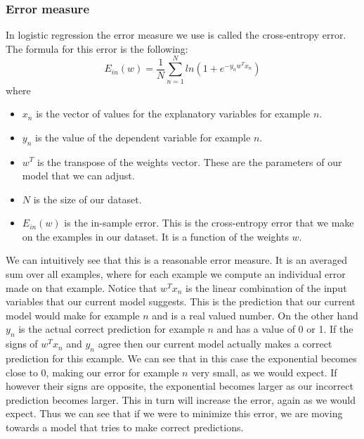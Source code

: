 \subsubsection{Error measure}
In logistic regression the error measure we use is called the cross-entropy error\cite{caltechmachinelearning}. The formula for this error is the following:
$$
	E_{in}(w) = \frac{1}{N}\sum_{n=1}^{N}ln(1+e^{-y_{n}w^{T}x_{n}})
$$
where
\begin{itemize}
	\item $x_{n}$ is the vector of values for the explanatory variables for example $n$.
	\item $y_{n}$ is the value of the dependent variable for example $n$.
	\item $w^T$ is the transpose of the weights vector. These are the parameters of our model that we can adjust.
	\item $N$ is the size of our dataset.
	\item $E_{in}(w)$ is the in-sample error. This is the cross-entropy error that we make on the examples in our dataset. It is a function of the weights $w$.
\end{itemize}
We can intuitively see that this is a reasonable error measure. It is an averaged sum over all examples, where for each example we compute an individual error made on that example. Notice that $w^{T}x_{n}$ is the linear combination of the input variables that our current model suggests. This is the prediction that our current model would make for example $n$ and is a real valued number. On the other hand $y_{n}$ is the actual correct prediction for example $n$ and has a value of 0 or 1. If the signs of $w^{T}x_{n}$ and $y_{n}$ agree then our current model actually makes a correct prediction for this example. We can see that in this case the exponential becomes close to 0, making our error for example $n$ very small, as we would expect. If however their signs are opposite, the exponential becomes larger as our incorrect prediction becomes larger. This in turn will increase the error, again as we would expect. Thus we can see that if we were to minimize this error, we are moving towards a model that tries to make correct predictions.
